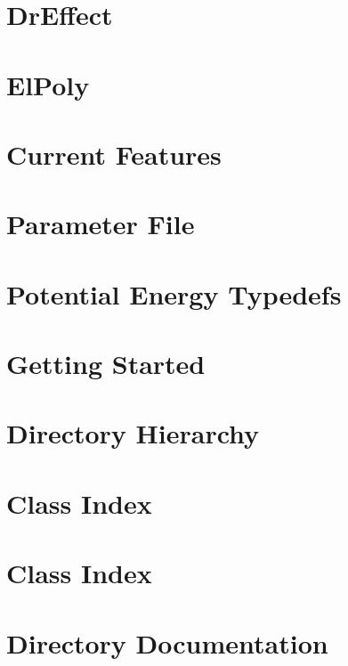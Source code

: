 \documentclass[letterpaper]{article}
\begin{document}
\section{\-Dr\-Effect}
\label{DrEffect_page}
\hypertarget{DrEffect_page}{}

\section{\-El\-Poly}
\label{ElPoly_page}
\hypertarget{ElPoly_page}{}

\section{\-Current \-Features}
\label{features_page}
\hypertarget{features_page}{}

\section{\-Parameter \-File}
\label{param_page}
\hypertarget{param_page}{}

\section{\-Potential \-Energy \-Typedefs}
\label{typedef_page}
\hypertarget{typedef_page}{}

\section{\-Getting \-Started}
\label{usage_page}
\hypertarget{usage_page}{}

\section{\-Directory \-Hierarchy}

\section{\-Class \-Index}

\section{\-Class \-Index}

\section{\-Directory \-Documentation}










\end{document}
